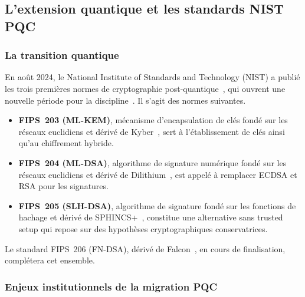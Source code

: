 \subsection{L'extension quantique et les standards NIST PQC}
\label{subsec:extension_quantique_contexte}
\begin{sloppypar}

\subsubsection{La transition quantique}
\label{subsubsec:transition_quantique}

En ao\^ut 2024, le National Institute of Standards and Technology (NIST) a publi\'e
les trois premi\`eres normes de cryptographie post-quantique~\cite{NISTPQC,Alagic2020,NISTPostQuantum2022}, qui ouvrent une nouvelle
p\'eriode pour la discipline~\cite{Chen2022}. Il s'agit des normes suivantes.

\begin{itemize}
\item \textbf{FIPS~203 (ML-KEM)}, m\'ecanisme d'encapsulation de cl\'es fond\'e sur
les r\'eseaux euclidiens et d\'eriv\'e de Kyber~\cite{Kyber2022}, sert \`a l'\'etablissement de cl\'es
ainsi qu'au chiffrement hybride.

\item \textbf{FIPS~204 (ML-DSA)}, algorithme de signature num\'erique fond\'e sur
les r\'eseaux euclidiens et d\'eriv\'e de Dilithium~\cite{Dilithium2022}, est appel\'e \`a remplacer ECDSA et RSA
pour les signatures.

\item \textbf{FIPS~205 (SLH-DSA)}, algorithme de signature fond\'e sur les fonctions
de hachage et d\'eriv\'e de SPHINCS+~\cite{SPHINCS2022}, constitue une alternative sans trusted setup qui repose sur
des hypoth\`eses cryptographiques conservatrices.
\end{itemize}

Le standard FIPS~206 (FN-DSA), d\'eriv\'e de Falcon~\cite{Falcon2022}, en cours de finalisation, compl\'etera cet ensemble.

\subsubsection{Enjeux institutionnels de la migration PQC}
\label{subsubsec:enjeux_pqc}


\end{sloppypar}
